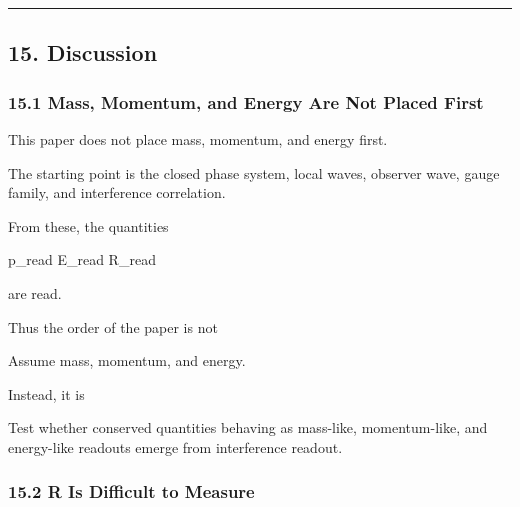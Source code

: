\documentclass[
  a4paper,
]{article}
\newenvironment{Shaded}{}{}
\newcommand{\NormalTok}[1]{#1}
\begin{document}
\begin{center}\rule{0.5\linewidth}{0.5pt}\end{center}

\subsection{15. Discussion}\label{discussion}

\subsubsection{15.1 Mass, Momentum, and Energy Are Not Placed
First}\label{mass-momentum-and-energy-are-not-placed-first}

This paper does not place mass, momentum, and energy first.

The starting point is the closed phase system, local waves, observer
wave, gauge family, and interference correlation.

From these, the quantities

\begin{Shaded}
\begin{Highlighting}[]
\NormalTok{p\_read}
\NormalTok{E\_read}
\NormalTok{R\_read}
\end{Highlighting}
\end{Shaded}

are read.

Thus the order of the paper is not

\begin{Shaded}
\begin{Highlighting}[]
\NormalTok{Assume mass, momentum, and energy.}
\end{Highlighting}
\end{Shaded}

Instead, it is

\begin{Shaded}
\begin{Highlighting}[]
\NormalTok{Test whether conserved quantities behaving as mass{-}like, momentum{-}like, and energy{-}like readouts emerge from interference readout.}
\end{Highlighting}
\end{Shaded}

\subsubsection{15.2 R Is Difficult to
Measure}\label{r-is-difficult-to-measure}
\end{document}
